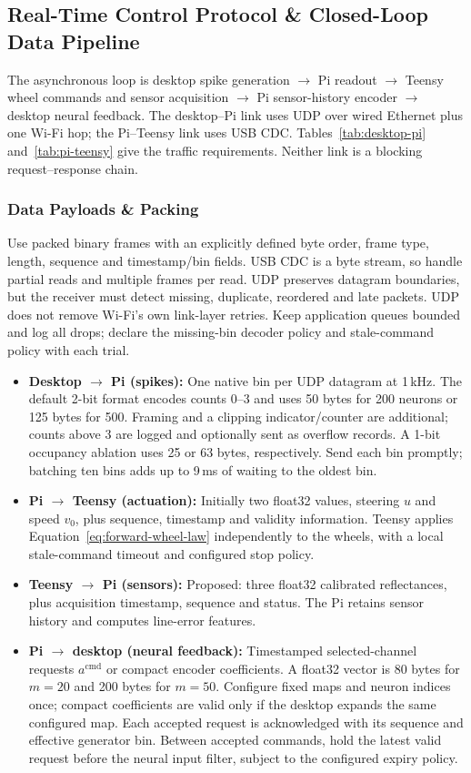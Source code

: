 \subsection{Real-Time Control Protocol \& Closed-Loop Data Pipeline}
The asynchronous loop is desktop spike generation $\to$ Pi readout $\to$ Teensy wheel commands and sensor acquisition $\to$ Pi sensor-history encoder $\to$ desktop neural feedback. The desktop--Pi link uses UDP over wired Ethernet plus one Wi-Fi hop; the Pi--Teensy link uses USB CDC. Tables~\ref{tab:desktop-pi} and~\ref{tab:pi-teensy} give the traffic requirements. Neither link is a blocking request--response chain.

\subsubsection{Data Payloads \& Packing}
Use packed binary frames with an explicitly defined byte order, frame type, length, sequence and timestamp/bin fields. USB CDC is a byte stream, so handle partial reads and multiple frames per read. UDP preserves datagram boundaries, but the receiver must detect missing, duplicate, reordered and late packets. UDP does not remove Wi-Fi's own link-layer retries. Keep application queues bounded and log all drops; declare the missing-bin decoder policy and stale-command policy with each trial.
\begin{itemize}
    \item \textbf{Desktop $\to$ Pi (spikes):} One native bin per UDP datagram at 1\,kHz. The default 2-bit format encodes counts 0--3 and uses 50 bytes for 200 neurons or 125 bytes for 500. Framing and a clipping indicator/counter are additional; counts above 3 are logged and optionally sent as overflow records. A 1-bit occupancy ablation uses 25 or 63 bytes, respectively. Send each bin promptly; batching ten bins adds up to 9\,ms of waiting to the oldest bin.
    \item \textbf{Pi $\to$ Teensy (actuation):} Initially two float32 values, steering $u$ and speed $v_0$, plus sequence, timestamp and validity information. Teensy applies Equation~\eqref{eq:forward-wheel-law} independently to the wheels, with a local stale-command timeout and configured stop policy.
    \item \textbf{Teensy $\to$ Pi (sensors):} Proposed: three float32 calibrated reflectances, plus acquisition timestamp, sequence and status. The Pi retains sensor history and computes line-error features.
    \item \textbf{Pi $\to$ desktop (neural feedback):} Timestamped selected-channel requests $a^{\mathrm{cmd}}$ or compact encoder coefficients. A float32 vector is 80 bytes for $m=20$ and 200 bytes for $m=50$. Configure fixed maps and neuron indices once; compact coefficients are valid only if the desktop expands the same configured map. Each accepted request is acknowledged with its sequence and effective generator bin. Between accepted commands, hold the latest valid request before the neural input filter, subject to the configured expiry policy.
\end{itemize}

